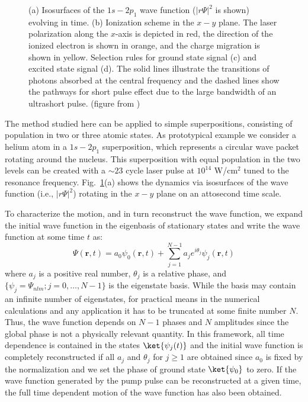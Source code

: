\begin{figure}[!ht]
\centering
\caption{(a) Isosurfaces of the $1s-2p_1$ wave function ($|r\Psi|^2$ is shown) evolving in time. (b) Ionization scheme in the $x-y$ plane. The laser polarization along the $x$-axis is depicted in red, the direction of the ionized electron is shown in orange, and the charge migration is shown in yellow. Selection rules for ground state signal (c) and excited state signal (d). The solid lines illustrate the transitions of photons absorbed at the central frequency and the dashed lines show the pathways for short pulse effect due to the large bandwidth of an ultrashort pulse. (figure from \cite{venzke2021_wave})
} 
  \label{fig:dynamic_visualization}
\end{figure}

The method studied here can be applied to simple superpositions, consisting of population in two or three atomic states. As prototypical example we consider a helium atom in a $1s-2p_1$ superposition, which represents a circular wave packet rotating around the nucleus. This superposition with equal population in the two levels can be created with a $\sim23$ cycle laser pulse at $10^{14}$ W/cm$^2$ tuned to the resonance frequency. Fig.~\ref{fig:dynamic_visualization}(a) shows the dynamics via isosurfaces of the wave function (i.e., $\left|r\Psi\right|^2$) rotating in the $x-y$ plane on an attosecond time scale. 

To characterize the motion, and in turn reconstruct the wave function, we expand the initial wave function in the eigenbasis of stationary states and write the wave function at some time $t$ as: 
%
\begin{equation}
    \Psi({\bm r},t) = a_0 \psi_0({\bm r},t) + \sum_{j=1}^{N-1} a_j e^{i\theta_j} \psi_j({\bm r},t)
    \label{eq:expansion}
\end{equation}
%
where $a_j$ is a positive real number, $\theta_j $ is a relative phase, and $\{ \psi_j = \Psi_{nlm}; j = 0, \ldots, N-1\}$ is the eigenstate basis. While the basis may contain an infinite number of eigenstates, for practical means in the numerical calculations and any application it has to be truncated at some finite number $N$. Thus, the wave function depends on $N-1$ phases and $N$ amplitudes since the global phase is not a physically relevant quantity. In this framework, all time dependence is contained in the states $\ket{\psi_j(t)}$ and the initial wave function is completely reconstructed if all $a_j$ and $\theta_j$ for $j\geq 1$ are obtained since $a_0$ is fixed by the normalization and we set the phase of ground state $\ket{\psi_0}$ to zero. If the wave function generated by the pump pulse can be reconstructed at a given time, the full time dependent motion of the wave function has also been obtained.

